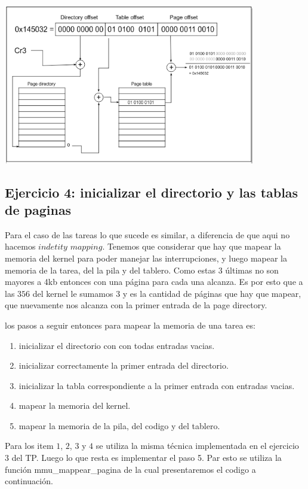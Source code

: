 \documentclass[a4paper,10pt,twoside]{article}
\begin{document}
\includegraphics[height=7cm]{iddMap.png}

\subsection{Ejercicio 4: inicializar el directorio y las tablas de paginas}

Para el caso de las tareas lo que sucede es similar, a diferencia de que aqui no hacemos $indetity$ $mapping$. 
Tenemos que considerar que hay que mapear la memoria del kernel para poder manejar las interrupciones, y luego mapear la memoria de la tarea, del la pila y del tablero. Como estas $3$ últimas no son mayores a 4kb entonces con una página para cada una alcanza. Es por esto que a las $356$ del kernel le sumamos $3$ y es la cantidad de páginas que hay que mapear, que nuevamente nos alcanza con la primer entrada de la page directory.

los pasos a seguir entonces para mapear la memoria de una tarea es:

\begin{enumerate}
 \item inicializar el directorio con con todas entradas vacias.
 \item inicializar correctamente la primer entrada del directorio.
 \item inicializar la tabla correspondiente a la primer entrada con entradas vacias.
 \item mapear la memoria del kernel.
 \item mapear la memoria de la pila, del codigo y del tablero.
\end{enumerate}

Para los item $1$, $2$, $3$ y $4$ se utiliza la misma técnica implementada en el ejercicio $3$ del TP.
Luego lo que resta es implementar el paso 5. Par esto se utiliza la función mmu\_mappear\_pagina de la cual presentaremos el codigo a continuación.\\
\end{document}
